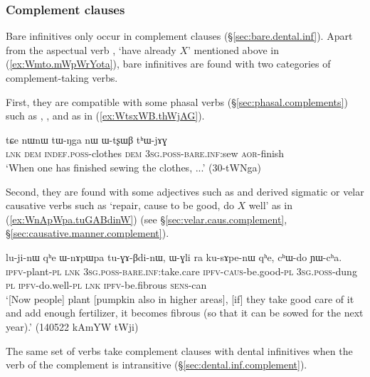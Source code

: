 \subsubsection{Complement clauses} \label{sec:bare.inf.complement} 
Bare infinitives only occur in complement clauses (§\ref{sec:bare.dental.inf}). Apart from the aspectual verb , `have already $X$' mentioned above in (\ref{ex:Wmto.mWpWrYota}), bare infinitives are found with two categories of com\-ple\-ment-taking verbs.

First, they are compatible with some phasal verbs (§\ref{sec:phasal.complements}) such as , ,  and  as in (\ref{ex:WtsxWB.thWjAG}).

\begin{exe} 
\ex \label{ex:WtsxWB.thWjAG}
\gll  tɕe nɯnɯ tɯ-ŋga nɯ ɯ-tʂɯβ tʰɯ-jɤɣ \\
\textsc{lnk} \textsc{dem} \textsc{indef}.\textsc{poss}-clothes \textsc{dem} \textsc{3sg}.\textsc{poss}-\textsc{bare}.\textsc{inf}:sew \textsc{aor}-finish   \\
\glt `When one has finished sewing the clothes, ...' (30-tWNga)
\end{exe} 

Second, they are found with some adjectives such as  and derived sigmatic or velar causative verbs such as  `repair, cause to be good, do $X$ well' as in (\ref{ex:WnApWpa.tuGABdinW}) (see §\ref{sec:velar.caus.complement}, §\ref{sec:causative.manner.complement}).

\begin{exe} 
\ex \label{ex:WnApWpa.tuGABdinW}
\gll lu-ji-nɯ qʰe ɯ-nɤpɯpa tu-ɣɤ-βdi-nɯ, ɯ-ɣli ra ku-sɤpe-nɯ qʰe, cʰɯ-do ɲɯ-cʰa. \\
\textsc{ipfv}-plant-\textsc{pl} \textsc{lnk} \textsc{3sg}.\textsc{poss}-\textsc{bare}.\textsc{inf}:take.care \textsc{ipfv}-\textsc{caus}-be.good-\textsc{pl} \textsc{3sg}.\textsc{poss}-dung \textsc{pl} \textsc{ipfv}-do.well-\textsc{pl} \textsc{lnk} \textsc{ipfv}-be.fibrous \textsc{sens}-can \\
\glt `[Now people] plant [pumpkin also in higher areas], [if] they take good care of it and add enough fertilizer, it becomes fibrous (so that it can be sowed for the next year).' (140522 kAmYW tWji)
\end{exe} 

The same set of verbs take complement clauses with dental infinitives when the verb of the complement is intransitive (§\ref{sec:dental.inf.complement}).

